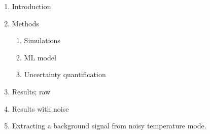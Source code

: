 \begin{enumerate}
\item Introduction
\item Methods
\begin{enumerate}
\item Simulations
\item ML model
\item Uncertainty quantification
\end{enumerate}
\item Results; raw
\item Results with noise
\item Extracting a background signal from noisy temperature mode.
\end{enumerate}
